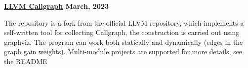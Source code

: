 \textbf{\href{https://github.com/jirol9xa/llvm-practice} {LLVM Callgraph} \hfill  March, 2023} \par
\begin{itemize}
The repository is a fork from the official LLVM repository, which implements a self-written tool for collecting Callgraph, the construction is carried out using graphviz. The program can work both statically and dynamically (edges in the graph gain weights). Multi-module projects are supported for more details, see the README 
\end{itemize} \par